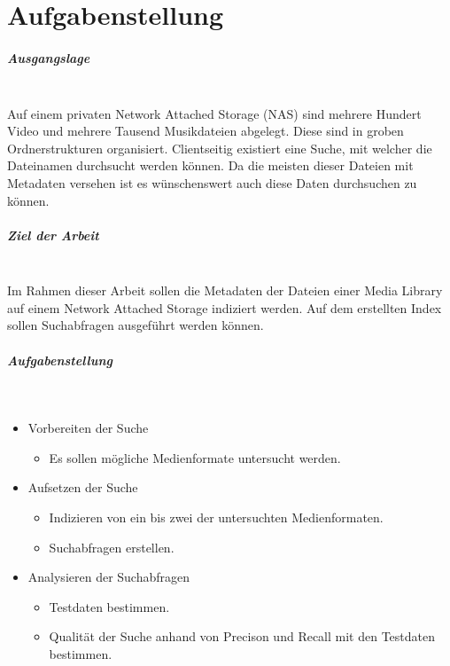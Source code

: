 \chapter{Aufgabenstellung}
\paragraph{Ausgangslage} \hfill \\
Auf einem privaten Network Attached Storage (NAS) sind mehrere Hundert Video und mehrere Tausend Musikdateien abgelegt. Diese sind in groben Ordnerstrukturen organisiert. Clientseitig existiert eine Suche, mit welcher die Dateinamen durchsucht werden können. Da die meisten dieser Dateien mit Metadaten versehen ist es wünschenswert auch diese Daten durchsuchen zu können.

\paragraph{Ziel der Arbeit} \hfill \\
Im Rahmen dieser Arbeit sollen die Metadaten der Dateien einer Media Library auf einem Network Attached Storage indiziert werden. Auf dem erstellten Index sollen Suchabfragen ausgeführt werden können.

\paragraph{Aufgabenstellung} \hfill \\
\begin{itemize}
    \item Vorbereiten der Suche
        \begin{itemize}
            \item Es sollen mögliche Medienformate untersucht werden.
        \end{itemize}
    \item Aufsetzen der Suche
        \begin{itemize}
            \item Indizieren von ein bis zwei der untersuchten Medienformaten.
            \item Suchabfragen erstellen.
        \end{itemize}
    \item Analysieren der Suchabfragen
        \begin{itemize}
            \item Testdaten bestimmen.
            \item Qualität der Suche anhand von Precison und Recall mit den Testdaten bestimmen.
        \end{itemize}
\end{itemize}

